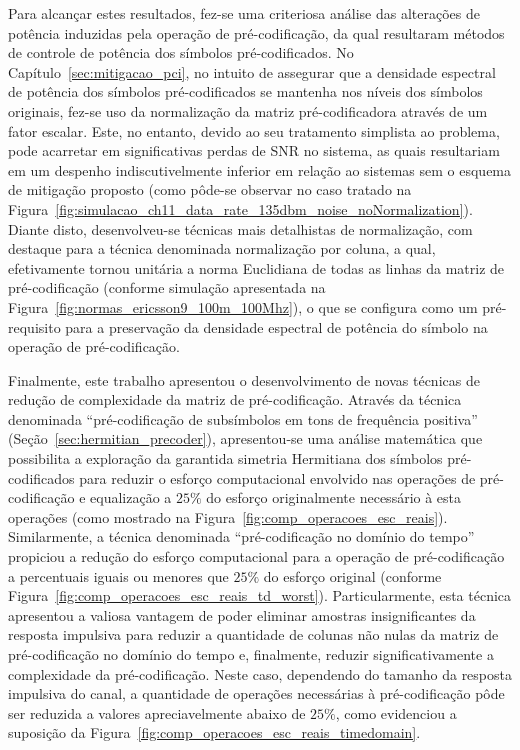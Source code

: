 Para alcançar estes resultados, fez-se uma criteriosa análise das alterações de potência induzidas pela operação de pré-codificação, da qual resultaram métodos de controle de potência dos símbolos pré-codificados. No Capítulo~\ref{sec:mitigacao_pci}, no intuito de assegurar que a densidade espectral de potência dos símbolos pré-codificados se mantenha nos níveis dos símbolos originais, fez-se uso da normalização da matriz pré-codificadora através de um fator escalar. Este, no entanto, devido ao seu tratamento simplista ao problema, pode acarretar em significativas perdas de SNR no sistema, as quais resultariam em um despenho indiscutivelmente inferior em relação ao sistemas sem o esquema de mitigação proposto (como pôde-se observar no caso tratado na Figura~\ref{fig:simulacao_ch11_data_rate_135dbm_noise_noNormalization}). Diante disto, desenvolveu-se técnicas mais detalhistas de normalização, com destaque para a técnica denominada normalização por coluna, a qual, efetivamente tornou unitária a norma Euclidiana de todas as linhas da matriz de pré-codificação (conforme simulação apresentada na Figura~\ref{fig:normas_ericsson9_100m_100Mhz}), o que se configura como um pré-requisito para a preservação da densidade espectral de potência do símbolo na operação de pré-codificação.

Finalmente, este trabalho apresentou o desenvolvimento de novas técnicas de redução de complexidade da matriz de pré-codificação. Através da técnica denominada ``pré-codificação de subsímbolos em tons de frequência positiva'' (Seção~\ref{sec:hermitian_precoder}), apresentou-se uma análise matemática que possibilita a exploração da garantida simetria Hermitiana dos símbolos pré-codificados para reduzir o esforço computacional envolvido nas operações de pré-codificação e equalização a $25\%$ do esforço originalmente necessário à esta operações (como mostrado na Figura~\ref{fig:comp_operacoes_esc_reais}). Similarmente, a técnica denominada ``pré-codificação no domínio do tempo'' propiciou a redução do esforço computacional para a operação de pré-codificação a percentuais iguais ou menores que $25\%$ do esforço original (conforme Figura~\ref{fig:comp_operacoes_esc_reais_td_worst}). Particularmente, esta técnica apresentou a valiosa vantagem de poder eliminar amostras insignificantes da resposta impulsiva para reduzir a quantidade de colunas não nulas da matriz de pré-codificação no domínio do tempo e, finalmente, reduzir significativamente a complexidade da pré-codificação. Neste caso, dependendo do tamanho da resposta impulsiva do canal, a quantidade de operações necessárias à pré-codificação pôde ser reduzida a valores apreciavelmente abaixo de $25\%$, como evidenciou a suposição da Figura~\ref{fig:comp_operacoes_esc_reais_timedomain}.

